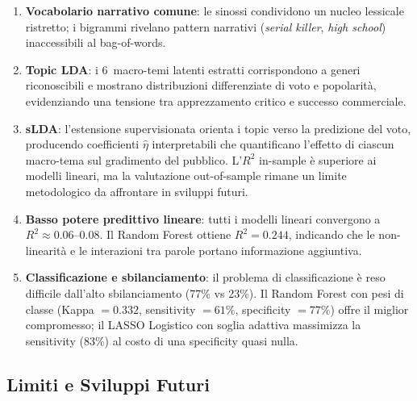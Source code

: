 \documentclass[12pt, a4paper]{article}
\begin{document}
\begin{enumerate}[leftmargin=1.8em]
  \item \textbf{Vocabolario narrativo comune}: le sinossi
        condividono un nucleo lessicale ristretto; i bigrammi
        rivelano pattern narrativi (\textit{serial killer},
        \textit{high school}) inaccessibili al bag-of-words.

  \item \textbf{Topic LDA}: i 6~macro-temi latenti estratti
        corrispondono a generi riconoscibili e mostrano
        distribuzioni differenziate di voto e popolarità,
        evidenziando una tensione tra apprezzamento critico
        e successo commerciale.

  \item \textbf{sLDA}: l'estensione supervisionata orienta
        i topic verso la predizione del voto, producendo
        coefficienti $\hat{\eta}$ interpretabili che
        quantificano l'effetto di ciascun macro-tema sul
        gradimento del pubblico. L'$R^2$ in-sample è
        superiore ai modelli lineari, ma la valutazione
        out-of-sample rimane un limite metodologico da
        affrontare in sviluppi futuri.

  \item \textbf{Basso potere predittivo lineare}: tutti i
        modelli lineari convergono a $R^2 \approx 0.06$--$0.08$.
        Il Random Forest ottiene $R^2 = 0.244$, indicando
        che le non-linearità e le interazioni tra parole
        portano informazione aggiuntiva.

  \item \textbf{Classificazione e sbilanciamento}: il problema
        di classificazione è reso difficile dall'alto
        sbilanciamento (77\% vs 23\%). Il Random Forest con
        pesi di classe (Kappa $= 0.332$, sensitivity $= 61\%$,
        specificity $= 77\%$) offre il miglior compromesso;
        il LASSO Logistico con soglia adattiva massimizza la
        sensitivity (83\%) al costo di una specificity
        quasi nulla.
\end{enumerate}

\subsection{Limiti e Sviluppi Futuri}
\end{document}
